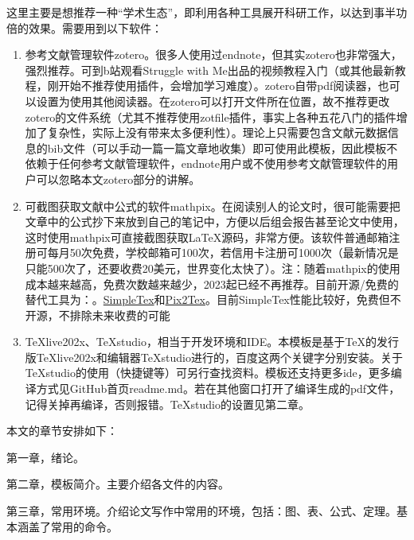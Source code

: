 这里主要是想推荐一种“学术生态”，即利用各种工具展开科研工作，以达到事半功倍的效果。需要用到以下软件：
\begin{enumerate}[topsep = 0 pt, itemsep= 0 pt, parsep=0pt, partopsep=0pt, leftmargin=44pt, itemindent=0pt, labelsep=6pt, label=(\arabic*)]
	\item 	参考文献管理软件zotero\cite{_m}。很多人使用过endnote，但其实zotero也非常强大，强烈推荐。可到b站观看Struggle with Me出品的视频教程\cite{_k}入门（或其他最新教程，刚开始不推荐使用插件，会增加学习难度）。zotero自带pdf阅读器，也可以设置为使用其他阅读器。在zotero可以打开文件所在位置，故不推荐更改zotero的文件系统（尤其不推荐使用zotfile插件，事实上各种五花八门的插件增加了复杂性，实际上没有带来太多便利性）。理论上只需要包含文献元数据信息的bib文件（可以手动一篇一篇文章地收集）即可使用此模板，因此模板不依赖于任何参考文献管理软件，endnote用户或不使用参考文献管理软件的用户可以忽略本文zotero部分的讲解。
	\item	可截图获取文献中公式的软件mathpix\cite{_h}。在阅读别人的论文时，很可能需要把文章中的公式抄下来放到自己的笔记中，方便以后组会报告甚至论文中使用，这时使用mathpix可直接截图获取\LaTeX{}源码，非常方便。该软件普通邮箱注册可每月50次免费，学校邮箱可100次，若信用卡注册可1000次（最新情况是只能500次了，还要收费20美元，世界变化太快了）。注：随着mathpix的使用成本越来越高，免费次数越来越少，2023起已经不再推荐。目前开源/免费的替代工具为：。\href{https://www.simpletex.cn/}{SimpleTex}和\href{https://p2t.breezedeus.com/}{Pix2Tex}。目前SimpleTex性能比较好，免费但不开源，不排除未来收费的可能
	\item	TeXlive202x、TeXstudio，相当于开发环境和IDE。本模板是基于TeX的发行版TeXlive202x和编辑器TeXstudio进行的，百度这两个关键字分别安装。关于TeXstudio的使用（快捷键等）可另行查找资料。模板还支持更多ide，更多编译方式见GitHub首页readme.md。若在其他窗口打开了编译生成的pdf文件，记得关掉再编译，否则报错。TeXstudio的设置见第二章。
\end{enumerate}

本文的章节安排如下：

第一章，绪论。

第二章，模板简介。主要介绍各文件的内容。

第三章，常用环境。介绍论文写作中常用的环境，包括：图、表、公式、定理。基本涵盖了常用的命令。



